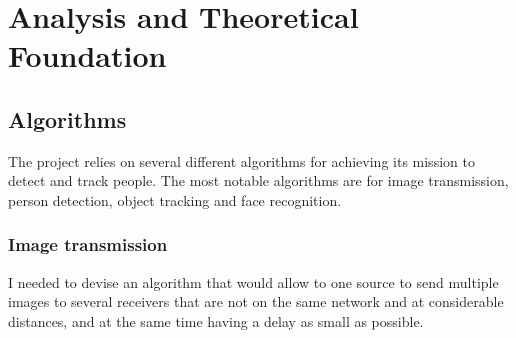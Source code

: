 
\chapter{Analysis and Theoretical Foundation}
\label{ch:analysis}

%
%
%

\section{Algorithms}
\label{sec:analysis-algorithms}
 The project relies on several different algorithms for achieving its mission to detect and track people.
 The most notable algorithms are for image transmission, person detection, object tracking and face recognition.

\subsection{Image transmission}
\label{subsec:image-transmission}
 I needed to devise an algorithm that would allow to one source to send multiple images to several receivers that are
 not on the same network and at considerable distances, and at the same time having a delay as small as possible.

